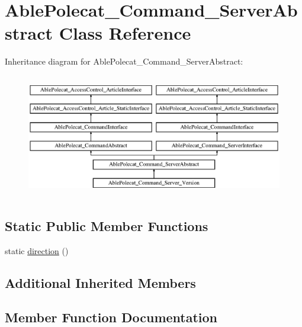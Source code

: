 \hypertarget{class_able_polecat___command___server_abstract}{}\section{Able\+Polecat\+\_\+\+Command\+\_\+\+Server\+Abstract Class Reference}
\label{class_able_polecat___command___server_abstract}
Inheritance diagram for Able\+Polecat\+\_\+\+Command\+\_\+\+Server\+Abstract\+:\begin{figure}[H]
\begin{center}
\leavevmode
\includegraphics[height=5.419355cm]{class_able_polecat___command___server_abstract}
\end{center}
\end{figure}
\subsection*{Static Public Member Functions}
\begin{DoxyCompactItemize}
\item 
static \hyperlink{class_able_polecat___command___server_abstract_a0f38ef3cd761210f2a667c669393498f}{direction} ()
\end{DoxyCompactItemize}
\subsection*{Additional Inherited Members}


\subsection{Member Function Documentation}
\hypertarget{class_able_polecat___command___server_abstract_a0f38ef3cd761210f2a667c669393498f}{}
